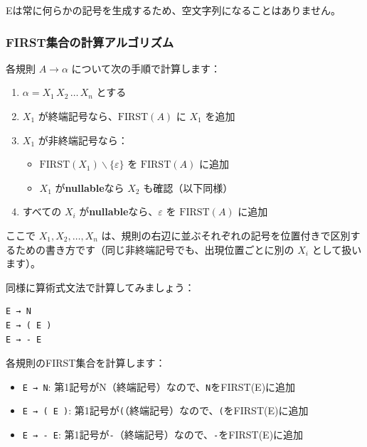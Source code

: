Eは常に何らかの記号を生成するため、空文字列になることはありません。

\hypertarget{chapter5-firstux96c6ux5408ux306eux8a08ux7b97ux30a2ux30ebux30b4ux30eaux30baux30e0}{%
\subsubsection{FIRST集合の計算アルゴリズム}\label{chapter5-firstux96c6ux5408ux306eux8a08ux7b97ux30a2ux30ebux30b4ux30eaux30baux30e0}}

各規則 \(A \to \alpha\) について次の手順で計算します：

\begin{enumerate}
\def\labelenumi{\arabic{enumi}.}
\tightlist
\item
  \(\alpha = X_1\,X_2\,\ldots\,X_n\) とする
\item
  \(X_1\) が終端記号なら、\(\mathrm{FIRST}(A)\) に \(X_1\) を追加
\item
  \(X_1\) が非終端記号なら：

  \begin{itemize}
  \tightlist
  \item
    \(\mathrm{FIRST}(X_1) \mathbin{\backslash} \{\varepsilon\}\) を
    \(\mathrm{FIRST}(A)\) に追加
  \item
    \(X_1\) が\textbf{nullable}なら \(X_2\) も確認（以下同様）
  \end{itemize}
\item
  すべての \(X_i\) が\textbf{nullable}なら、\(\varepsilon\) を
  \(\mathrm{FIRST}(A)\) に追加
\end{enumerate}

ここで \(X_1, X_2, \ldots, X_n\)
は、規則の右辺に並ぶそれぞれの記号を位置付きで区別するための書き方です（同じ非終端記号でも、出現位置ごとに別の
\(X_i\) として扱います）。

同様に算術式文法で計算してみましょう：

\begin{verbatim}
E → N
E → ( E )
E → - E
\end{verbatim}

各規則のFIRST集合を計算します：

\begin{itemize}
\tightlist
\item
  \texttt{E\ →\ N}:
  第1記号がN（終端記号）なので、\texttt{N}をFIRST(E)に追加
\item
  \texttt{E\ →\ (\ E\ )}:
  第1記号が\texttt{(}（終端記号）なので、\texttt{(}をFIRST(E)に追加
\item
  \texttt{E\ →\ -\ E}:
  第1記号が\texttt{-}（終端記号）なので、\texttt{-}をFIRST(E)に追加
\end{itemize}

